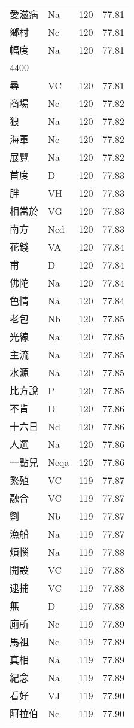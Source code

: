 \documentclass[twocolumn]{book}
\begin{document}
\begin{supertabular}{llrr}
愛滋病 & Na & 120 &  77.81\\
鄉村 & Nc & 120 &  77.81\\
幅度 & Na & 120 &  77.81\\
4400\\
尋 & VC & 120 &  77.81\\
商場 & Nc & 120 &  77.82\\
狼 & Na & 120 &  77.82\\
海軍 & Nc & 120 &  77.82\\
展覽 & Na & 120 &  77.82\\
首度 & D & 120 &  77.83\\
胖 & VH & 120 &  77.83\\
相當於 & VG & 120 &  77.83\\
南方 & Ncd & 120 &  77.83\\
花錢 & VA & 120 &  77.84\\
甫 & D & 120 &  77.84\\
佛陀 & Na & 120 &  77.84\\
色情 & Na & 120 &  77.84\\
老包 & Nb & 120 &  77.85\\
光線 & Na & 120 &  77.85\\
主流 & Na & 120 &  77.85\\
水源 & Na & 120 &  77.85\\
比方說 & P & 120 &  77.85\\
不肯 & D & 120 &  77.86\\
十六日 & Nd & 120 &  77.86\\
人選 & Na & 120 &  77.86\\
一點兒 & Neqa & 120 &  77.86\\
繁殖 & VC & 119 &  77.87\\
融合 & VC & 119 &  77.87\\
劉 & Nb & 119 &  77.87\\
漁船 & Na & 119 &  77.87\\
煩惱 & Na & 119 &  77.88\\
開設 & VC & 119 &  77.88\\
逮捕 & VC & 119 &  77.88\\
無 & D & 119 &  77.88\\
廁所 & Nc & 119 &  77.89\\
馬祖 & Nc & 119 &  77.89\\
真相 & Na & 119 &  77.89\\
紀念 & Na & 119 &  77.89\\
看好 & VJ & 119 &  77.90\\
阿拉伯 & Nc & 119 &  77.90\\

\end{supertabular}
\end{document}
